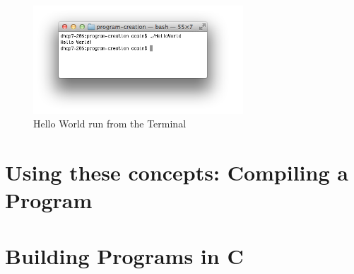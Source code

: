 \begin{figure}[b]
   \centering
   \includegraphics[width=0.7\textwidth]{./topics/programs-and-compilers/images/HelloWorld} 
   \caption{Hello World run from the Terminal}
   \label{fig:run-1-helloworld}
\end{figure}






% 







\clearpage
\section{Using these concepts: Compiling a Program} %
\label{sec:using_these_concepts_compiling_a_program}




\clearpage
\def\pageLang{c}
\section{Building Programs in C} %
\label{sec:building_programs_in_c}






